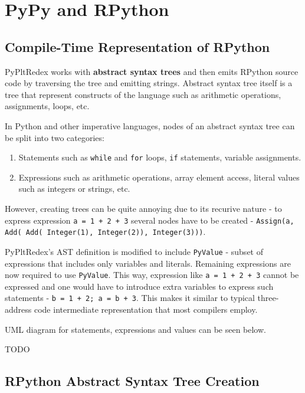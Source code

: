 \chapter{PyPy and RPython}

\section{Compile-Time Representation of RPython}

PyPltRedex works with \textbf{abstract syntax trees} and then emits RPython source code by traversing the tree and emitting strings. Abstract syntax tree itself is a tree that represent constructs of the language such as arithmetic operations, assignments, loops, etc.

In Python and other imperative languages, nodes of an abstract syntax tree can be split into two categories:

\begin{enumerate}
\item
	Statements such as \texttt{while} and \texttt{for} loops, \texttt{if} statements, variable assignments.
\item
	Expressions such as arithmetic operations, array element access, literal values such as integers or strings, etc.
\end{enumerate}

However, creating trees can be quite annoying due to its recurive nature - to express expression \texttt{a = 1 + 2 + 3} several nodes have to be created - \texttt{Assign(a, Add( Add( Integer(1), Integer(2)), Integer(3)))}. 

PyPltRedex's AST definition is modified to include \texttt{PyValue} - subset of expressions that includes only variables and literals. Remaining expressions are now required to use \texttt{PyValue}. This way, expression like \texttt{a = 1 + 2 + 3} cannot be expressed and one would have to introduce extra variables to express such statements - \texttt{b = 1 + 2; a = b + 3}. This makes it similar to typical three-address code intermediate representation that most compilers employ.

UML diagram for statements, expressions and values can be seen below. 

TODO

\section{RPython Abstract Syntax Tree Creation}

